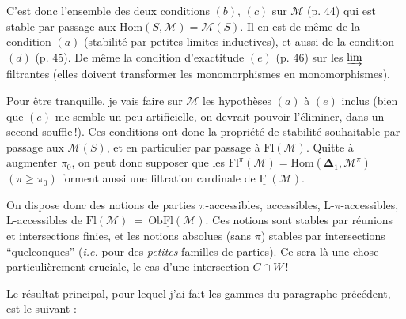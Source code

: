 \documentclass[11pt]{article}
\newcommand{\printedpage}[1]{\marginpar{\footnotesize p.~#1}}
\newcommand{\msp}[1]{\marginpar{\footnotesize [#1]}}
\newcommand{\Fl}{\mathrm{Fl}}
\newcommand{\Ob}{\mathrm{Ob}}
\newcommand{\uHom}{\underline{\mathrm{Hom}}}
\newcommand{\uFl}{\underline{\mathrm{Fl}}}
\begin{document}
C'est donc l'ensemble des deux conditions $(b)$, $(c)$ sur $\mathcal{M}$ (p. 44) qui est stable par passage aux $\uHom(S,\mathcal{M}) = \mathcal{M}(S)$. Il en est de même de la condition $(a)$ (stabilité par petites limites inductives), et aussi de la condition\msp{page 75}
$(d)$ (p. 45). De même la condition d'exactitude $(e)$ (p. 46) sur les $\varinjlim$ filtrantes (elles doivent transformer les monomorphismes en monomorphismes).

Pour être tranquille, je vais faire sur $\mathcal{M}$ les hypothèses $(a)$ à $(e)$ inclus (bien que $(e)$ me semble un peu artificielle, on devrait pouvoir l'éliminer, dans un second souffle\,!). Ces conditions ont donc la propriété de stabilité souhaitable par passage aux $\mathcal{M}(S)$, et en particulier par passage à $\Fl(\mathcal{M})$. Quitte à augmenter $\pi_{0}$, on peut donc supposer que les $\Fl^{\pi}(\mathcal{M}) = \mathrm{Hom}(\boldsymbol{\Delta}_{1},\mathcal{M}^{\pi})$ $(\pi \geq \pi_{0})$ forment aussi une filtration cardinale de $\uFl(\mathcal{M})$.

On dispose donc des notions de parties $\pi$-accessibles, accessibles, L-$\pi$-accessibles, L-accessibles de $\Fl(\mathcal{M}) \ = \ \Ob\uFl(\mathcal{M})$. Ces notions sont stables par réunions et intersections finies, et les notions absolues (sans $\pi$) stables par intersections ``quelconques'' (\textit{i.e.} pour des \textit{petites} familles de parties). Ce sera là une chose particulièrement\printedpage{42}%
\msp{page 76}
cruciale, le cas d'une intersection $C \cap W$\,!

Le résultat principal, pour lequel j'ai fait les gammes du paragraphe précédent, est le suivant :
\end{document}
